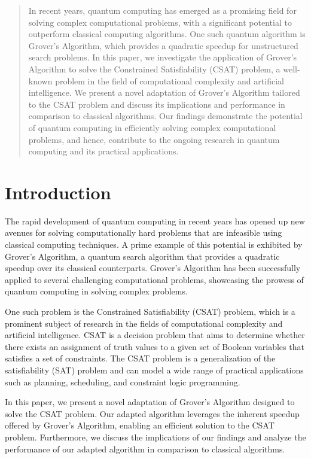 \begin{abstract}
In recent years, quantum computing has emerged as a promising field for solving complex computational problems, with a significant potential to outperform classical computing algorithms. One such quantum algorithm is Grover's Algorithm, which provides a quadratic speedup for unstructured search problems. In this paper, we investigate the application of Grover's Algorithm to solve the Constrained Satisfiability (CSAT) problem, a well-known problem in the field of computational complexity and artificial intelligence. We present a novel adaptation of Grover's Algorithm tailored to the CSAT problem and discuss its implications and performance in comparison to classical algorithms. Our findings demonstrate the potential of quantum computing in efficiently solving complex computational problems, and hence, contribute to the ongoing research in quantum computing and its practical applications.

\end{abstract}

\section{Introduction}

The rapid development of quantum computing in recent years has opened up new avenues for solving computationally hard problems that are infeasible using classical computing techniques. A prime example of this potential is exhibited by Grover's Algorithm, a quantum search algorithm that provides a quadratic speedup over its classical counterparts. Grover's Algorithm has been successfully applied to several challenging computational problems, showcasing the prowess of quantum computing in solving complex problems.

One such problem is the Constrained Satisfiability (CSAT) problem, which is a prominent subject of research in the fields of computational complexity and artificial intelligence. CSAT is a decision problem that aims to determine whether there exists an assignment of truth values to a given set of Boolean variables that satisfies a set of constraints. The CSAT problem is a generalization of the satisfiability (SAT) problem and can model a wide range of practical applications such as planning, scheduling, and constraint logic programming.

In this paper, we present a novel adaptation of Grover's Algorithm designed to solve the CSAT problem. Our adapted algorithm leverages the inherent speedup offered by Grover's Algorithm, enabling an efficient solution to the CSAT problem. Furthermore, we discuss the implications of our findings and analyze the performance of our adapted algorithm in comparison to classical algorithms.

